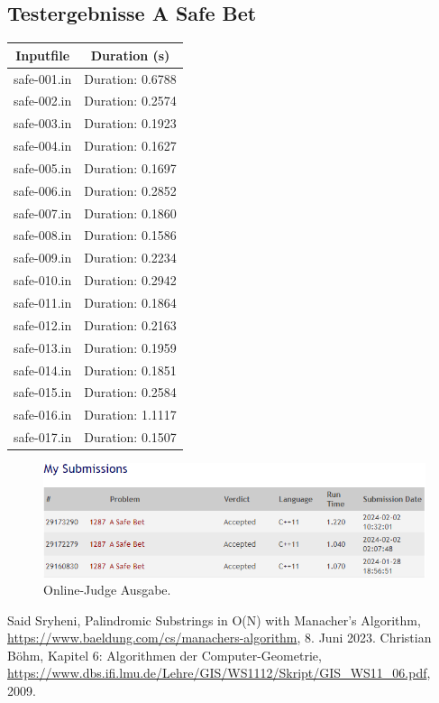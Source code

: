 \subsection{Testergebnisse A Safe Bet}
\label{subsec:Mathematik}
\centering
\begin{tabular}[h]{c|c}
    \textbf{Inputfile} & \textbf{Duration (s)} \\
    \hline
    safe-001.in & Duration: 0.6788 \\
    safe-002.in & Duration: 0.2574 \\
    safe-003.in & Duration: 0.1923 \\
    safe-004.in & Duration: 0.1627 \\
    safe-005.in & Duration: 0.1697 \\
    safe-006.in & Duration: 0.2852 \\
    safe-007.in & Duration: 0.1860 \\
    safe-008.in & Duration: 0.1586 \\
    safe-009.in & Duration: 0.2234 \\
    safe-010.in & Duration: 0.2942 \\
    safe-011.in & Duration: 0.1864 \\
    safe-012.in & Duration: 0.2163 \\
    safe-013.in & Duration: 0.1959 \\
    safe-014.in & Duration: 0.1851 \\
    safe-015.in & Duration: 0.2584 \\
    safe-016.in & Duration: 1.1117 \\
    safe-017.in & Duration: 0.1507 \\
\end{tabular}
\begin{figure}[h]
    \centering
    \includegraphics[width=14cm]{Bilder2/Abb6.PNG}
    \caption{Online-Judge Ausgabe.}
    \label{fig:enter-label}
\end{figure}
%
\begin{thebibliography}{99}
     Said Sryheni, Palindromic Substrings in O(N) with Manacher's Algorithm, \url{https://www.baeldung.com/cs/manachers-algorithm}, 8. Juni 2023.
     Christian Böhm, Kapitel 6: Algorithmen der Computer-Geometrie, \url{https://www.dbs.ifi.lmu.de/Lehre/GIS/WS1112/Skript/GIS_WS11_06.pdf}, 2009.
\end{thebibliography}
%